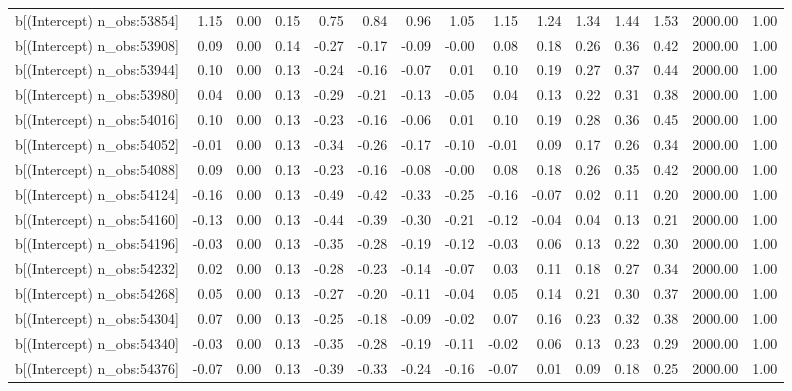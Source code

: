 \begin{table}[ht]
\begin{tabular}{rrrrrrrrrrrrrrr}
  b[(Intercept) n\_obs:53854] & 1.15 & 0.00 & 0.15 & 0.75 & 0.84 & 0.96 & 1.05 & 1.15 & 1.24 & 1.34 & 1.44 & 1.53 & 2000.00 & 1.00 \\ 
  b[(Intercept) n\_obs:53908] & 0.09 & 0.00 & 0.14 & -0.27 & -0.17 & -0.09 & -0.00 & 0.08 & 0.18 & 0.26 & 0.36 & 0.42 & 2000.00 & 1.00 \\ 
  b[(Intercept) n\_obs:53944] & 0.10 & 0.00 & 0.13 & -0.24 & -0.16 & -0.07 & 0.01 & 0.10 & 0.19 & 0.27 & 0.37 & 0.44 & 2000.00 & 1.00 \\ 
  b[(Intercept) n\_obs:53980] & 0.04 & 0.00 & 0.13 & -0.29 & -0.21 & -0.13 & -0.05 & 0.04 & 0.13 & 0.22 & 0.31 & 0.38 & 2000.00 & 1.00 \\ 
  b[(Intercept) n\_obs:54016] & 0.10 & 0.00 & 0.13 & -0.23 & -0.16 & -0.06 & 0.01 & 0.10 & 0.19 & 0.28 & 0.36 & 0.45 & 2000.00 & 1.00 \\ 
  b[(Intercept) n\_obs:54052] & -0.01 & 0.00 & 0.13 & -0.34 & -0.26 & -0.17 & -0.10 & -0.01 & 0.09 & 0.17 & 0.26 & 0.34 & 2000.00 & 1.00 \\ 
  b[(Intercept) n\_obs:54088] & 0.09 & 0.00 & 0.13 & -0.23 & -0.16 & -0.08 & -0.00 & 0.08 & 0.18 & 0.26 & 0.35 & 0.42 & 2000.00 & 1.00 \\ 
  b[(Intercept) n\_obs:54124] & -0.16 & 0.00 & 0.13 & -0.49 & -0.42 & -0.33 & -0.25 & -0.16 & -0.07 & 0.02 & 0.11 & 0.20 & 2000.00 & 1.00 \\ 
  b[(Intercept) n\_obs:54160] & -0.13 & 0.00 & 0.13 & -0.44 & -0.39 & -0.30 & -0.21 & -0.12 & -0.04 & 0.04 & 0.13 & 0.21 & 2000.00 & 1.00 \\ 
  b[(Intercept) n\_obs:54196] & -0.03 & 0.00 & 0.13 & -0.35 & -0.28 & -0.19 & -0.12 & -0.03 & 0.06 & 0.13 & 0.22 & 0.30 & 2000.00 & 1.00 \\ 
  b[(Intercept) n\_obs:54232] & 0.02 & 0.00 & 0.13 & -0.28 & -0.23 & -0.14 & -0.07 & 0.03 & 0.11 & 0.18 & 0.27 & 0.34 & 2000.00 & 1.00 \\ 
  b[(Intercept) n\_obs:54268] & 0.05 & 0.00 & 0.13 & -0.27 & -0.20 & -0.11 & -0.04 & 0.05 & 0.14 & 0.21 & 0.30 & 0.37 & 2000.00 & 1.00 \\ 
  b[(Intercept) n\_obs:54304] & 0.07 & 0.00 & 0.13 & -0.25 & -0.18 & -0.09 & -0.02 & 0.07 & 0.16 & 0.23 & 0.32 & 0.38 & 2000.00 & 1.00 \\ 
  b[(Intercept) n\_obs:54340] & -0.03 & 0.00 & 0.13 & -0.35 & -0.28 & -0.19 & -0.11 & -0.02 & 0.06 & 0.13 & 0.23 & 0.29 & 2000.00 & 1.00 \\ 
  b[(Intercept) n\_obs:54376] & -0.07 & 0.00 & 0.13 & -0.39 & -0.33 & -0.24 & -0.16 & -0.07 & 0.01 & 0.09 & 0.18 & 0.25 & 2000.00 & 1.00 \\ 

\end{tabular}
\end{table}
